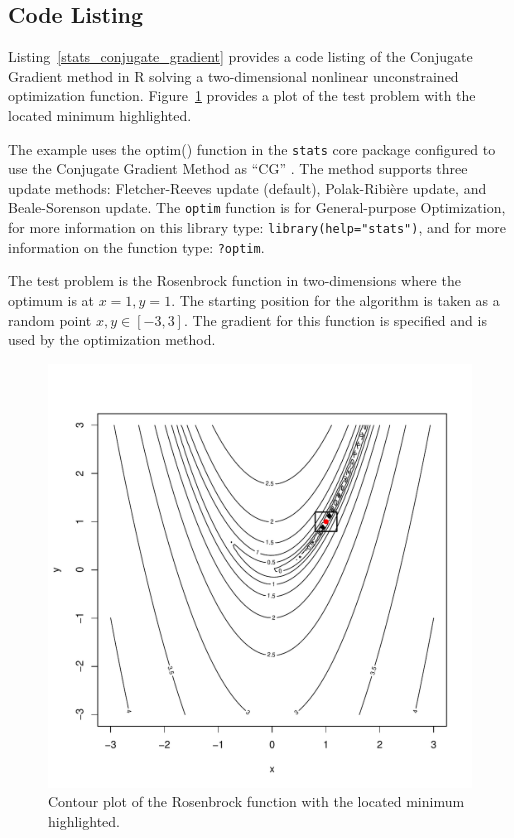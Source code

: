 \subsection{Code Listing}
Listing~\ref{stats_conjugate_gradient} provides a code listing of the Conjugate Gradient method in R solving a two-dimensional nonlinear unconstrained optimization function. Figure~\ref{plot:conjugate_gradient_result} provides a plot of the test problem with the located minimum highlighted.

The example uses the {optim()} function in the \texttt{stats} core package configured to use the Conjugate Gradient Method as ``CG'' \cite{RDevelopmentCoreTeam2011a}. The method supports three update methods: Fletcher-Reeves update (default), Polak-Ribi\`ere update, and Beale-Sorenson update. The \texttt{optim} function is for General-purpose Optimization, for more information on this library type: \texttt{library(help="stats")}, and for more information on the function type: \texttt{?optim}.

The test problem is the Rosenbrock function in two-dimensions where the optimum is at $x=1,y=1$. The starting position for the algorithm is taken as a random point $x,y \in [-3,3]$. The gradient for this function is specified and is used by the optimization method.



\begin{figure}[htp]
\centering
\includegraphics[scale=0.45]{a_optimization/conjugate_gradient_result.pdf}
\caption{Contour plot of the Rosenbrock function with the located minimum highlighted.}
\label{plot:conjugate_gradient_result}
\end{figure}

